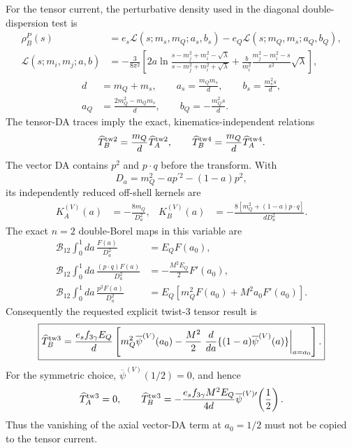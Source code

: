 \documentclass[11pt]{article}
\begin{document}
For the tensor current, the perturbative density used in the diagonal
double-dispersion test is
\begin{align}
 \rho_B^P(s)&=e_s\mathcal L(s;m_s,m_Q;a_s,b_s)
              -e_Q\mathcal L(s;m_Q,m_s;a_Q,b_Q),\nonumber\\
 \mathcal L(s;m_i,m_j;a,b)&=-\frac{3}{8\pi^2}\left[
 2a\ln\frac{s-m_j^2+m_i^2-\sqrt{\lambda}}
 {s-m_j^2+m_i^2+\sqrt{\lambda}}
 +\frac{b}{m_i^2}\frac{m_j^2-m_i^2-s}{s^2}\sqrt{\lambda}\right],
 \label{eq:tensor-perturbative-density}
\end{align}
\begin{align}
 d&=m_Q+m_s,\qquad
 a_s=\frac{m_Qm_s}{d},\qquad
 b_s=\frac{m_s^2s}{d},\nonumber\\
 a_Q&=\frac{2m_Q^2-m_Qm_s}{d},\qquad
 b_Q=-\frac{m_Q^2s}{d}.
\end{align}
The tensor-DA traces imply the exact, kinematics-independent relations
\begin{equation}
 \widehat T_B^{\rm tw2}=\frac{m_Q}{d}\widehat T_A^{\rm tw2},
 \qquad
 \widehat T_B^{\rm tw4}=\frac{m_Q}{d}\widehat T_A^{\rm tw4}.
 \label{eq:tensor-safe-two-particle-ratios}
\end{equation}
The vector DA contains $p^2$ and $p\cdot q$ before the transform.  With
\begin{equation}
 D_a=m_Q^2-a p^{\prime2}-(1-a)p^2,
 \label{eq:Da-definition}
\end{equation}
its independently reduced off-shell kernels are
\begin{align}
 K_A^{(V)}(a)&=-\frac{8m_Q}{D_a^2},&
 K_B^{(V)}(a)&=-\frac{8[m_Q^2+(1-a)p\cdot q]}{dD_a^2}.
 \label{eq:vector-preborel-reduced-kernels}
\end{align}
The exact $n=2$ double-Borel maps in this variable are
\begin{align}
 \mathcal B_{12}\int_0^1da\,\frac{F(a)}{D_a^2}
 &=E_QF(a_0),\nonumber\\
 \mathcal B_{12}\int_0^1da\,\frac{(p\cdot q)F(a)}{D_a^2}
 &=-\frac{M^2E_Q}{2}F'(a_0),\nonumber\\
 \mathcal B_{12}\int_0^1da\,\frac{p^2F(a)}{D_a^2}
 &=E_Q\left[m_Q^2F(a_0)+M^2a_0F'(a_0)\right].
 \label{eq:explicit-n2-borel-maps-a}
\end{align}
Consequently the requested explicit twist-3 tensor result is
\begin{equation}
 \boxed{
 \widehat T_B^{\rm tw3}
 =\frac{e_sf_{3\gamma}E_Q}{d}
 \left[
 m_Q^2\overline\psi^{(V)}(a_0)
 -\frac{M^2}{2}
 \left.\frac{d}{da}
 \{(1-a)\overline\psi^{(V)}(a)\}\right|_{a=a_0}
 \right].}
 \label{eq:tensor-vector-explicit-borel}
\end{equation}
For the symmetric choice, $\overline\psi^{(V)}(1/2)=0$, and hence
\begin{equation}
 \widehat T_A^{\rm tw3}=0,\qquad
 \widehat T_B^{\rm tw3}
 =-\frac{e_sf_{3\gamma}M^2E_Q}{4d}
 \overline\psi^{(V)\prime}\!\left(\frac12\right).
 \label{eq:symmetric-vector-borel}
\end{equation}
Thus the vanishing of the axial vector-DA term at $a_0=1/2$ must not be
copied to the tensor current.
\end{document}
